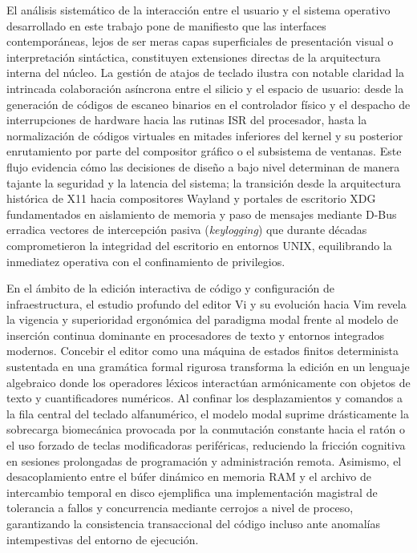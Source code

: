\documentclass[12pt]{article}
\begin{document}
El análisis sistemático de la interacción entre el usuario y el sistema operativo desarrollado en este trabajo pone de manifiesto que las interfaces contemporáneas, lejos de ser meras capas superficiales de presentación visual o interpretación sintáctica, constituyen extensiones directas de la arquitectura interna del núcleo. La gestión de atajos de teclado ilustra con notable claridad la intrincada colaboración asíncrona entre el silicio y el espacio de usuario: desde la generación de códigos de escaneo binarios en el controlador físico y el despacho de interrupciones de hardware hacia las rutinas ISR del procesador, hasta la normalización de códigos virtuales en mitades inferiores del kernel y su posterior enrutamiento por parte del compositor gráfico o el subsistema de ventanas. Este flujo evidencia cómo las decisiones de diseño a bajo nivel determinan de manera tajante la seguridad y la latencia del sistema; la transición desde la arquitectura histórica de X11 hacia compositores Wayland y portales de escritorio XDG fundamentados en aislamiento de memoria y paso de mensajes mediante D-Bus erradica vectores de intercepción pasiva (\textit{keylogging}) que durante décadas comprometieron la integridad del escritorio en entornos UNIX, equilibrando la inmediatez operativa con el confinamiento de privilegios.

En el ámbito de la edición interactiva de código y configuración de infraestructura, el estudio profundo del editor Vi y su evolución hacia Vim revela la vigencia y superioridad ergonómica del paradigma modal frente al modelo de inserción continua dominante en procesadores de texto y entornos integrados modernos. Concebir el editor como una máquina de estados finitos determinista sustentada en una gramática formal rigurosa transforma la edición en un lenguaje algebraico donde los operadores léxicos interactúan armónicamente con objetos de texto y cuantificadores numéricos. Al confinar los desplazamientos y comandos a la fila central del teclado alfanumérico, el modelo modal suprime drásticamente la sobrecarga biomecánica provocada por la conmutación constante hacia el ratón o el uso forzado de teclas modificadoras periféricas, reduciendo la fricción cognitiva en sesiones prolongadas de programación y administración remota. Asimismo, el desacoplamiento entre el búfer dinámico en memoria RAM y el archivo de intercambio temporal en disco ejemplifica una implementación magistral de tolerancia a fallos y concurrencia mediante cerrojos a nivel de proceso, garantizando la consistencia transaccional del código incluso ante anomalías intempestivas del entorno de ejecución.
\end{document}
